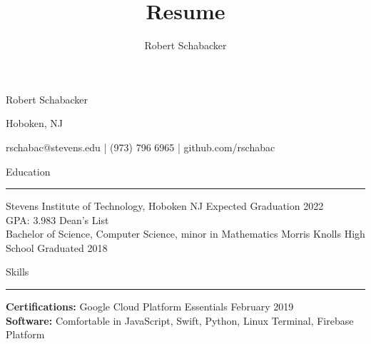 \documentclass{article}
\title{Resume}
\author{Robert Schabacker}
\newcommand \spacingBetweenHeadings {0.5em}
\begin{document}
\begin{center}
{\Huge Robert Schabacker\par}
{\Large Hoboken, NJ\par}
{\Large rschabac@stevens.edu  |  (973) 796 6965  |  github.com/rschabac\par}
\end{center}
\vspace{0.7em}
\vspace{\spacingBetweenHeadings}

\noindent
\huge Education\par
\vspace{0.1em}
\hrule
\Large
\vspace{1em}
\noindent
Stevens Institute of Technology, Hoboken NJ
\hfill
Expected Graduation 2022\\
GPA: 3.983 \hspace{0.7cm} Dean's List\\
Bachelor of Science, Computer Science, minor in Mathematics
\vspace{1em}
\newline
Morris Knolls High School
\hfill
Graduated 2018\\
\vspace{0.8em}

\noindent
\huge Skills\par
\vspace{0.1em}
\hrule
\Large
\vspace{1em}
\noindent
\textbf{Certifications:} Google Cloud Platform Essentials
\hfill
February 2019\\
\textbf{Software:} Comfortable in JavaScript, Swift, Python, Linux Terminal, Firebase Platform\\
\vspace{\spacingBetweenHeadings}
\end{document}
